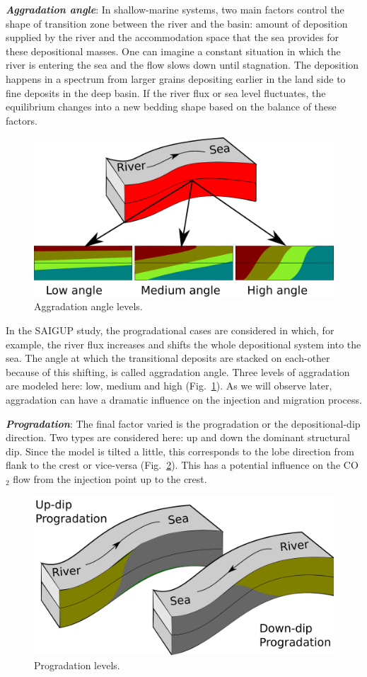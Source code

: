 \textbf{\textit{Aggradation angle}}: 
In shallow-marine systems, two main factors control the shape of transition zone
between the river and the basin: amount of deposition supplied by the river and the
accommodation space that the sea provides for these depositional masses. One can imagine a
constant situation in which the river is entering the sea and the flow slows down until
stagnation. The deposition happens in a spectrum from larger grains depositing earlier in
the land side to fine deposits in the deep basin. If the river flux or sea level
fluctuates, the equilibrium changes into a new bedding shape based on the balance of these
factors.

\begin{figure}[thb]
  \centering
  \includegraphics[width=0.65 \linewidth]{./figurer/agr} 
  \caption{Aggradation angle levels.}
  \label{fig:agrLvl}
%
\end{figure}

In the SAIGUP study, the progradational cases are considered in which, for example, the
river flux increases and shifts the whole depositional system into the sea. The angle at
which the transitional deposits are stacked on each-other because of this shifting, is
called aggradation angle. Three levels of aggradation are modeled here: low, medium and
high (Fig.~\ref{fig:agrLvl}). As we will observe later, aggradation can have a dramatic
influence on the injection and migration process.

\textbf{\textit{Progradation}}: 
The final factor varied is the progradation or the depositional-dip
direction. Two types are considered here: up and down the dominant structural dip. Since
the model is tilted a little, this corresponds to the lobe direction from flank to the
crest or vice-versa (Fig.~\ref{fig:proLvl}). This has a potential influence on the CO$_2$ flow
from the injection point up to the crest.


\begin{figure}[thb]
  \centering
  \includegraphics[width=0.65 \linewidth]{./figurer/progradation} 
  \caption{Progradation levels.}
  \label{fig:proLvl}
%
\end{figure}


